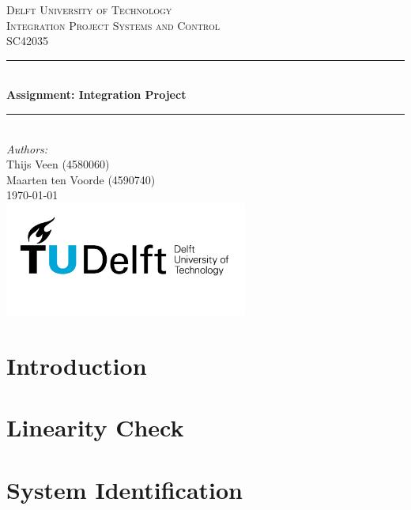 \documentclass[a4paper]{article}
\begin{document}
\begin{titlepage}

\newcommand{\HRule}{\rule{\linewidth}{0.5mm}} 							%
\center 
 
\textsc{\LARGE Delft University of Technology}\\[1cm]

\textsc{\Large Integration Project Systems and Control}\\[0.2cm]
\textsc{\large SC42035}\\[1cm] 										%
\HRule \\[0.8cm]
{ \huge \bfseries Assignment: Integration Project}\\[0.7cm]								%
\HRule \\[2cm]
\large
\emph{Authors:}\\
Thijs Veen (4580060)\\
Maarten ten Voorde (4590740)\\[1.5cm]	%
{\large \today}\\[5cm]
\includegraphics[width=0.6\textwidth]{images/TU_delft_logo.jpg}\\[1cm] 	%
\vfill 
\end{titlepage}


\section{Introduction}
%
\section{Linearity Check}
%

\section{System Identification}
%
%
%
% 
% 
\newpage
\end{document}
